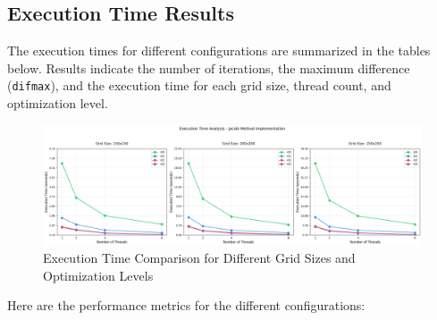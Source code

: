 \documentclass{article}
\begin{document}
\newpage
\subsection{Execution Time Results}

The execution times for different configurations are summarized in the tables below. Results indicate the number of iterations, the maximum difference (\texttt{difmax}), and the execution time for each grid size, thread count, and optimization level.

\begin{figure}[H]
    \centering
    \includegraphics[width=\linewidth]{Images/Plot1.png}
    \caption{Execution Time Comparison for Different Grid Sizes and Optimization Levels}
    \label{fig:plot1}
\end{figure}

Here are the performance metrics for the different configurations:
\end{document}
